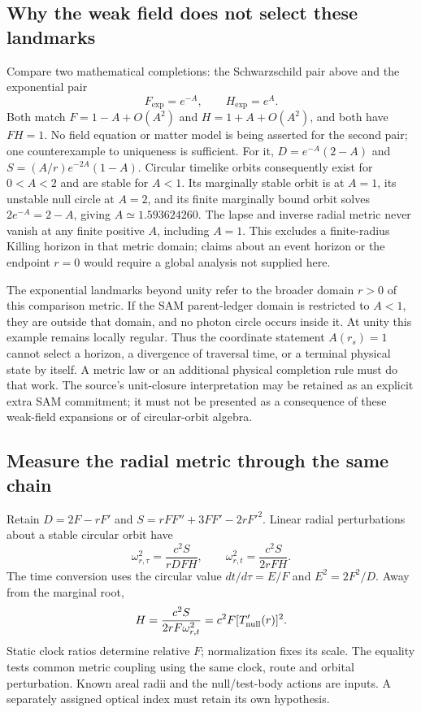 \documentclass[10pt,twocolumn,letterpaper]{article}
\begin{document}
\subsection{Why the weak field does not select these landmarks}
Compare two mathematical completions: the Schwarzschild pair above
and the exponential pair
\begin{equation}
 F_{\exp}=e^{-A},\qquad H_{\exp}=e^A.
 \label{eq:orbit-exponential-counterexample}
\end{equation}
Both match $F=1-A+O(A^2)$ and $H=1+A+O(A^2)$, and both have
$FH=1$. No field equation or matter model is being asserted for the
second pair; one counterexample to uniqueness is sufficient.
For it, $D=e^{-A}(2-A)$ and
$S=(A/r)e^{-2A}(1-A)$. Circular timelike orbits consequently exist
for $0<A<2$ and are stable for $A<1$. Its marginally stable orbit
is at $A=1$, its unstable null circle at $A=2$, and its finite
marginally bound orbit solves $2e^{-A}=2-A$, giving
$A\simeq1.593624260$. The lapse and inverse radial metric never
vanish at any finite positive $A$, including $A=1$.
This excludes a finite-radius Killing horizon in that metric domain;
claims about an event horizon or the endpoint $r=0$ would require a
global analysis not supplied here.

The exponential landmarks beyond unity refer to the broader domain
$r>0$ of this comparison metric. If the SAM parent-ledger domain is
restricted to $A<1$, they are outside that domain, and no photon circle
occurs inside it. At unity this example remains locally regular.
Thus the coordinate statement $A(r_s)=1$ cannot select a horizon,
a divergence of traversal time, or a terminal physical state by itself.
A metric law or an additional physical completion rule must do that
work. The source's unit-closure interpretation may be retained as an
explicit extra SAM commitment; it must not be presented as a consequence
of these weak-field expansions or of circular-orbit algebra.


\subsection{Measure the radial metric through the same chain}
Retain $D=2F-rF'$ and $S=rFF''+3FF'-2rF'^2$. Linear radial
perturbations about a stable circular orbit have
\begin{equation}
 \omega_{r,\tau}^2=\frac{c^2S}{rDFH},\qquad
 \omega_{r,t}^2=\frac{c^2S}{2rFH}.
 \label{eq:ch5-radial-frequency}
\end{equation}
The time conversion uses the circular value $dt/d\tau=E/F$ and
$E^2=2F^2/D$. Away from the marginal root,
\begin{equation}
 H=\frac{c^2S}{2rF\omega_{r,t}^2}
   =c^2F[T'_{\rm null}(r)]^2.
 \label{eq:ch5-H-inference}
\end{equation}
Static clock ratios determine relative $F$; normalization fixes its
scale. The equality tests common metric coupling using the same
clock, route and orbital perturbation. Known areal radii and the
null/test-body actions are inputs. A separately assigned optical index
must retain its own hypothesis.
\end{document}
